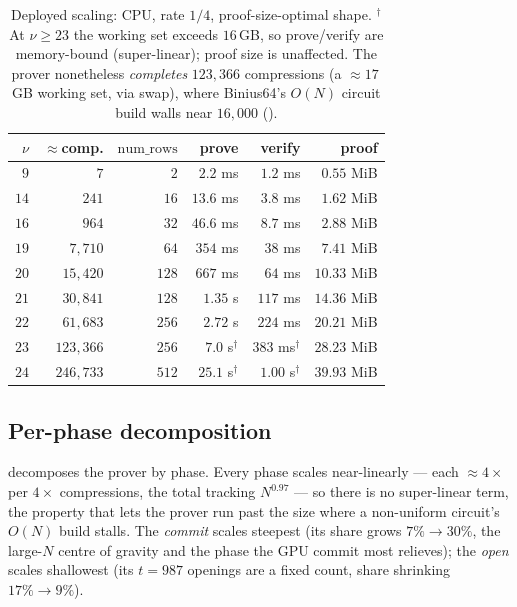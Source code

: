 \begin{table}[h]
\centering
\renewcommand{\arraystretch}{1.15}
\begin{tabular}{r r r r r r}
\toprule
$\nu$ & $\approx$comp. & $\mathrm{num\_rows}$ & prove & verify & proof \\
\midrule
$9$  & $7$         & $2$   & $2.2$ ms  & $1.2$ ms  & $0.55$ MiB \\
$14$ & $241$       & $16$  & $13.6$ ms & $3.8$ ms  & $1.62$ MiB \\
$16$ & $964$       & $32$  & $46.6$ ms & $8.7$ ms  & $2.88$ MiB \\
$19$ & $7{,}710$   & $64$  & $354$ ms  & $38$ ms   & $7.41$ MiB \\
$20$ & $15{,}420$  & $128$ & $667$ ms  & $64$ ms   & $10.33$ MiB \\
$21$ & $30{,}841$  & $128$ & $1.35$ s  & $117$ ms  & $14.36$ MiB \\
$22$ & $61{,}683$  & $256$ & $2.72$ s  & $224$ ms  & $20.21$ MiB \\
$23$ & $123{,}366$ & $256$ & $7.0$ s$^\dagger$  & $383$ ms$^\dagger$ & $28.23$ MiB \\
$24$ & $246{,}733$ & $512$ & $25.1$ s$^\dagger$ & $1.00$ s$^\dagger$ & $39.93$ MiB \\
\bottomrule
\end{tabular}
\caption{Deployed scaling: CPU, rate $1/4$, proof-size-optimal shape. $^\dagger$At
$\nu\ge 23$ the working set exceeds $16$\,GB, so prove/verify are memory-bound
(super-linear); proof size is unaffected. The prover nonetheless \emph{completes}
$123{,}366$ compressions (a $\approx$$17$\,GB working set, via swap), where
Binius64's $O(N)$ circuit build walls near $16{,}000$ ().}
\label{tab:zinc-scaling}
\end{table}

\subsection{Per-phase decomposition}
\label{sec:app-perphase}

 decomposes the prover by phase. Every phase scales
near-linearly --- each $\approx 4\times$ per $4\times$ compressions, the total
tracking $N^{0.97}$ --- so there is no super-linear term, the property that lets
the prover run past the size where a non-uniform circuit's $O(N)$ build stalls.
The \emph{commit} scales steepest (its share grows $7\%\to30\%$, the large-$N$
centre of gravity and the phase the GPU commit most relieves); the \emph{open}
scales shallowest (its $t = 987$ openings are a fixed count, share shrinking
$17\%\to9\%$).

